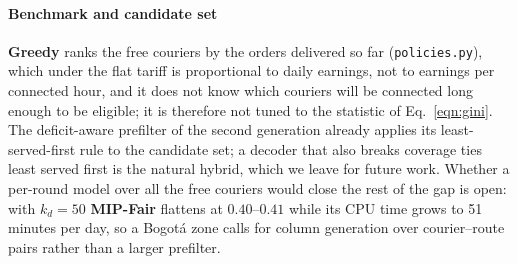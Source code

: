 \documentclass[a4paper,11pt,review,3p,authoryear]{elsarticle}
\begin{document}
\paragraph{Benchmark and candidate set} \textbf{Greedy} ranks the free couriers by the orders delivered so far (\texttt{policies.py}), which under the flat tariff is proportional to daily earnings, not to earnings per connected hour, and it does not know which couriers will be connected long enough to be eligible; it is therefore not tuned to the statistic of Eq.~\eqref{eqn:gini}. The deficit-aware prefilter of the second generation already applies its least-served-first rule to the candidate set; a decoder that also breaks coverage ties least served first is the natural hybrid, which we leave for future work. Whether a per-round model over all the free couriers would close the rest of the gap is open: with $k_d = 50$ \textbf{MIP-Fair} flattens at $0.40$--$0.41$ while its CPU time grows to 51 minutes per day, so a Bogot\'a zone calls for column generation over courier--route pairs rather than a larger prefilter.
\end{document}
